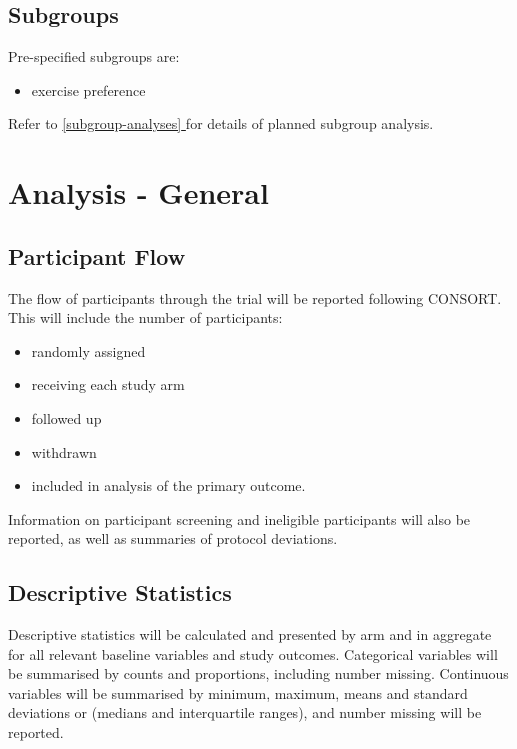 \documentclass[
]{article}
\providecommand{\tightlist}{%
  \setlength{\itemsep}{0pt}\setlength{\parskip}{0pt}}
\newcommand*{\fullref}[1]{\hyperref[{#1}]{\autoref*{#1} \nameref*{#1}}} %
\begin{document}
\hypertarget{subgroups}{%
  \subsection{Subgroups}\label{subgroups}}

Pre-specified subgroups are:

\begin{itemize}
  \item exercise preference
\end{itemize}

Refer to \fullref{subgroup-analyses} for details of planned subgroup analysis.

\clearpage


\hypertarget{analysis-general}{%
  \section{Analysis - General}\label{analysis-general}}

\hypertarget{participant-flow}{%
  \subsection{Participant Flow}\label{participant-flow}}

The flow of participants through the trial will be reported following CONSORT.
This will include the number of participants:

\begin{itemize}
  \tightlist
  \item randomly assigned  
  \item receiving each study arm
  \item followed up
  \item withdrawn
  \item included in analysis of the primary outcome.
\end{itemize}

Information on participant screening and ineligible participants will also be reported, as well as summaries of protocol deviations.


\hypertarget{descriptive-statistics}{%
  \subsection{Descriptive Statistics}\label{descriptive-statistics}}

Descriptive statistics will be calculated and presented by arm and in aggregate for all relevant baseline variables and study outcomes.
Categorical variables will be summarised by counts and proportions, including number missing.
Continuous variables will be summarised by minimum, maximum, means and standard deviations or (medians and interquartile ranges), and number missing will be reported.
\end{document}
